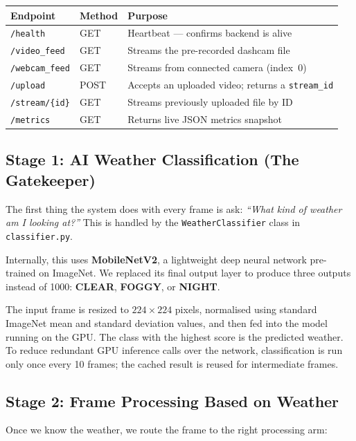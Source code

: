 \documentclass[12pt, a4paper]{article}
\begin{document}
\begin{center}
\begin{tabular}{lll}
  \toprule
  \textbf{Endpoint} & \textbf{Method} & \textbf{Purpose}\\
  \midrule
  \texttt{/health}             & GET  & Heartbeat — confirms backend is alive\\
  \texttt{/video\_feed}        & GET  & Streams the pre-recorded dashcam file\\
  \texttt{/webcam\_feed}       & GET  & Streams from connected camera (index~0)\\
  \texttt{/upload}            & POST & Accepts an uploaded video; returns a \texttt{stream\_id}\\
  \texttt{/stream/\{id\}}     & GET  & Streams previously uploaded file by ID\\
  \texttt{/metrics}           & GET  & Returns live JSON metrics snapshot\\
  \bottomrule
\end{tabular}
\end{center}

\subsection{Stage 1: AI Weather Classification (The Gatekeeper)}

The first thing the system does with every frame is ask: \textit{``What kind
of weather am I looking at?''} This is handled by the \texttt{WeatherClassifier}
class in \texttt{classifier.py}.

Internally, this uses \textbf{MobileNetV2}, a lightweight deep neural network
pre-trained on ImageNet. We replaced its final output layer to produce three
outputs instead of 1000: \textbf{CLEAR}, \textbf{FOGGY}, or \textbf{NIGHT}.

The input frame is resized to $224 \times 224$ pixels, normalised using standard
ImageNet mean and standard deviation values, and then fed into the model running
on the GPU. The class with the highest score is the predicted weather. To reduce
redundant GPU inference calls over the network, classification is run only once
every 10 frames; the cached result is reused for intermediate frames.

\subsection{Stage 2: Frame Processing Based on Weather}

Once we know the weather, we route the frame to the right processing arm:
\end{document}
